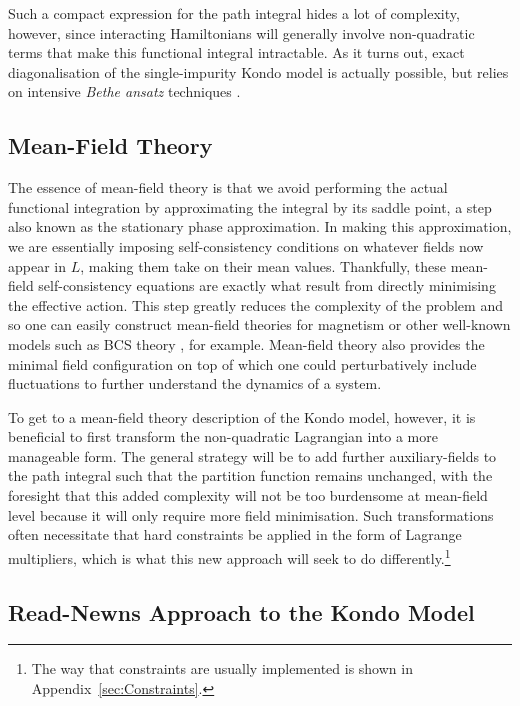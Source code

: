 Such a compact expression for the path integral hides a lot of complexity, however, since interacting Hamiltonians will generally involve non-quadratic terms that make this functional integral intractable. As it turns out, exact diagonalisation of the single-impurity Kondo model is actually possible, but relies on intensive \emph{Bethe ansatz} techniques \cite{BetheAnsatz}.

\subsection{Mean-Field Theory}

The essence of mean-field theory is that we avoid performing the actual functional integration by approximating the integral by its saddle point, a step also known as the stationary phase approximation. In making this approximation, we are essentially imposing self-consistency conditions on whatever fields now appear in $ L $, making them take on their mean values. Thankfully, these mean-field self-consistency equations are exactly what result from directly minimising the effective action. This step greatly reduces the complexity of the problem and so one can easily construct mean-field theories for magnetism or other well-known models such as BCS theory \cite{ManyBodyPhysics}, for example. Mean-field theory also provides the minimal field configuration on top of which one could perturbatively include fluctuations to further understand the dynamics of a system.

To get to a mean-field theory description of the Kondo model, however, it is beneficial to first transform the non-quadratic Lagrangian into a more manageable form. The general strategy will be to add further auxiliary-fields to the path integral such that the partition function remains unchanged, with the foresight that this added complexity will not be too burdensome at mean-field level because it will only require more field minimisation. Such transformations often necessitate that hard constraints be applied in the form of Lagrange multipliers, which is what this new approach will seek to do differently.\footnote{The way that constraints are usually implemented is shown in Appendix~\ref{sec:Constraints}.}


\subsection{Read-Newns Approach to the Kondo Model}

